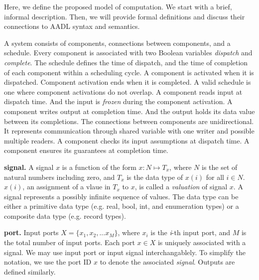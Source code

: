 Here, we define the proposed model of computation. We start with a brief, informal description. Then, we will provide formal definitions and discuss their connections to AADL syntax and semantics.

A system consists of components, connections between components, and a schedule.
Every component is associated with two Boolean variables \emph{dispatch} and \emph{complete}.
The schedule defines the time of dispatch, and the time of completion of each component within a scheduling cycle.
A component is activated when it is dispatched.
Component activation ends when it is completed.
A valid schedule is one where component activations do not overlap.
A component reads input at dispatch time. %
And the input is \emph{frozen} during the component activation.
A component writes output at completion time. %
And the output holds its data value between its completions.
The connections between components are unidirectional. It represents communication through shared variable with one writer and possible multiple readers. 
A component checks its input assumptions at dispatch time. %
A component ensures its guarantees at completion time. 

{\bf signal.}
A signal $x$ is a function of the form $x: N \mapsto T_x$, where $N$ is the set of natural numbers including zero, and $T_x$ is the data type of $x(i)$ for all $i \in N$.
$x(i)$, an assignment of a vlaue in $T_x$ to $x$, is called a \emph{valuation} of signal $x$. A signal represents a possibly infinite sequence of values.
The data type can be either a primitive data type (e.g. real, bool, int, and enumeration types) or a composite data type (e.g. record types). 

{\bf port.}
Input ports $X = \{x_1, x_2, ... x_M\}$, where $x_i$ is the \emph{i}-th input port, and $M$ is the total number of input ports. Each port $x \in X$ is uniquely associated with a signal. We may use input port or input signal interchangablely. To simplify the notation, we use the port ID $x$ to denote the associated \emph{signal}. Outputs are defined similarly. 

